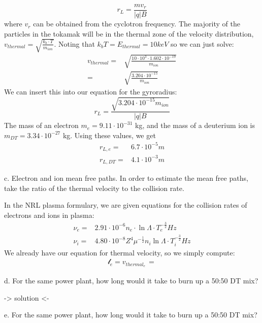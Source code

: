 \documentclass[12pt]{article}
\newenvironment{problem}[2][Problem]
{
	\begin{trivlist} 
		\item[\hskip \labelsep {\bfseries #1 #2:}]
	}
{
	\end{trivlist}
	}
\newenvironment{solution}[1][Solution]
{
	\begin{trivlist} 
		\item[\hskip \labelsep {\itshape #1:}]
	}
	{
	\end{trivlist}
}
\begin{document}
\begin{problem}{1}
\begin{solution}
\[
r_L = \frac{mv_r}{|q|B}
\]
where $v_r$ can be obtained from the cyclotron frequency. The majority of the particles in the tokamak will be in the thermal zone of the velocity distribution, $v_{thermal} = \sqrt{\frac{k_b \cdot T}{m_{ion}}}$. Noting that $k_b T = E_{thermal} = 10keV$ so we can just solve: 
\begin{align*}
	v_{thermal} =& \sqrt{\frac{10\cdot 10^3 \cdot 1.602\cdot 10^{-19}}{m_{ion}}}\\
		=& \sqrt{\frac{3.204\cdot 10^{-15}}{m_{ion}}}
\end{align*}
We can insert this into our equation for the gyroradius:
\[
	r_L = \frac{\sqrt{3.204\cdot 10^{-15} m_{ion}}}{|q|B}
\]
The mass of an electron $m_e = 9.11\cdot 10^{-31}$ kg, and the mass of a deuterium ion is $m_{DT} = 3.34\cdot 10^{-27}$ kg. Using these values, we get
\begin{align*}
	r_{L,e} =& 6.7 \cdot 10^{-5} m\\
	r_{L,DT} =& 4.1 \cdot 10^{-3} m
\end{align*}
\end{solution}
\noindent
\newline
\newline
c. Electron and ion mean free paths. In order to estimate the mean free paths, take the ratio of the thermal velocity to the collision rate. 
\begin{solution}
	In the NRL plasma formulary, we are given equations for the collision rates of electrons and ions in plasma:
	\begin{align*}
		\nu_{e} =& 2.91\cdot 10^{-6} n_e \cdot \ln{\Lambda} \cdot T_{e}^{-\frac{3}{2}} Hz\\
		\nu_i =& 4.80\cdot 10^{-8} Z^4 \mu^{-\frac{1}{2}} n_i \ln{\Lambda} \cdot T_{i}^{-\frac{3}{2}} Hz
	\end{align*}
We already have our equation for thermal velocity, so we simply compute:
\begin{align*}
	\mathscr{l}_e = v_{thermal_{e}}\frac{}{} = 
\end{align*}
\end{solution}
\noindent
\newline
\newline
d. For the same power plant, how long would it take to burn up a 50:50 DT mix?
\begin{solution}
-> solution <-
\end{solution}
\noindent
\newline
\newline
e. For the same power plant, how long would it take to burn up a 50:50 DT mix?

\end{problem}
\end{document}

